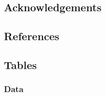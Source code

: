 \documentclass[
]{scrartcl}
\begin{document}
\newpage{}

\subsection{Acknowledgements}\label{sec-acknowledgements}

\newpage{}

\subsection{References}\label{references}

\newpage{}

\subsection{Tables}\label{tables}

\subsubsection{Data}\label{data-1}

\begingroup
\fontsize{9.0pt}{10.8pt}\selectfont
\end{document}
